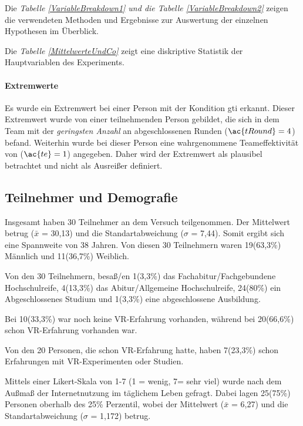 \documentclass[a4paper,11pt]{article}%
\renewcommand{\\}{\vspace*{0.5\baselineskip} \newline}
\begin{document}
Die \textit{Tabelle \ref{VariableBreakdown1} und die Tabelle \ref{VariableBreakdown2}} zeigen die verwendeten Methoden und Ergebnisse zur Auswertung der einzelnen Hypothesen im Überblick.

Die \textit{Tabelle \ref{MittelwerteUndCo}} zeigt eine diskriptive Statistik der Hauptvariablen des Experiments.

\paragraph{Extremwerte}
Es wurde ein Extremwert bei einer Person mit der Kondition \ac{gti} erkannt. Dieser Extremwert wurde von einer teilnehmenden Person gebildet, die sich in dem Team mit der \textit{geringsten Anzahl} an abgeschlossenen Runden ($\ac{tRound} = 4$) befand. Weiterhin wurde bei dieser Person eine wahrgenommene Teameffektivität von ($\ac{te} = 1$) angegeben. Daher wird der Extremwert als plausibel betrachtet und nicht als Ausreißer definiert.

	\subsection{Teilnehmer und Demografie}
Insgesamt haben 30 Teilnehmer an dem Versuch teilgenommen. Der Mittelwert betrug ($\bar{x}$ = 30,13) und die Standartabweichung ($\sigma$ = 7,44). Somit ergibt sich eine Spannweite von 38 Jahren. 
Von diesen 30 Teilnehmern waren 19(63,3\%) Männlich und 11(36,7\%) Weiblich. 

Von den 30 Teilnehmern, besaß/en 1(3,3\%) das Fachabitur/Fachgebundene Hochschulreife, 4(13,3\%) das Abitur/Allgemeine Hochschulreife, 24(80\%) ein Abgeschlossenes Studium und 1(3,3\%) eine abgeschlossene Ausbildung. 

Bei 10(33,3\%) war noch keine VR-Erfahrung vorhanden, während bei 20(66,6\%) schon VR-Erfahrung vorhanden war. 

Von den 20 Personen, die schon VR-Erfahrung hatte, haben 7(23,3\%) schon Erfahrungen mit VR-Experimenten oder Studien. 

Mittels einer Likert-Skala von 1-7 (1 = wenig, 7= sehr viel) wurde nach dem Außmaß der Internetnutzung im täglichem Leben gefragt. Dabei lagen 25(75\%) Personen oberhalb des 25\% Perzentil, wobei der Mittelwert ($\bar{x}$ = 6,27) und die Standartabweichung ($\sigma$ = 1,172) betrug.
 
\end{document}
